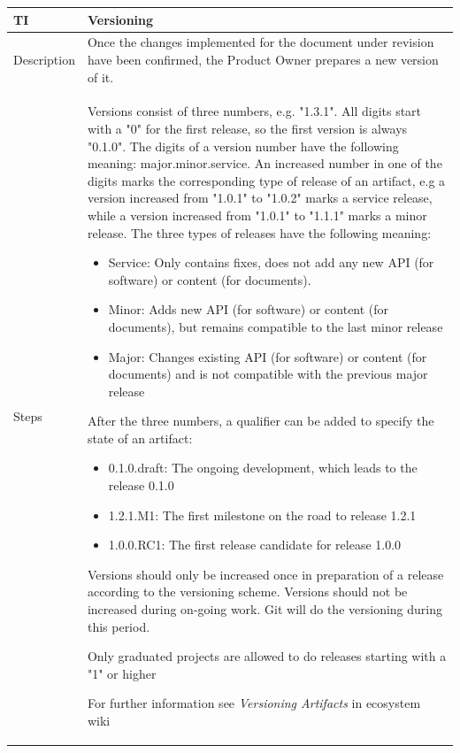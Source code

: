 \documentclass{template/openetcs_article}
\begin{document}
\begin{flushleft}
\tablefirsthead{}
\tablehead{}
\tabletail{}
\tablelasttail{}
\begin{supertabular}{|m{2cm}|m{13cm}|}
\hline
{}
TI & 
Versioning
\\\hline
Description &
Once the changes implemented for the document under revision have been confirmed, the Product Owner prepares a new version of it.
\\\hline
Steps &
Versions consist of three numbers, e.g. "1.3.1". All digits start with a "0" for the first release, so the first version is always "0.1.0". The digits of a version number have the following meaning: major.minor.service. An increased number in one of the digits marks the corresponding type of release of an artifact, e.g a version increased from "1.0.1" to "1.0.2" marks a service release, while a version increased from "1.0.1" to "1.1.1" marks a minor release. The three types of releases have the following meaning:
\begin{itemize}
\item Service: Only contains fixes, does not add any new API (for software) or content (for documents).
\item Minor: Adds new API (for software) or content (for documents), but remains compatible to the last minor release
\item Major: Changes existing API (for software) or content (for documents) and is not compatible with the previous major release
\end{itemize}
After the three numbers, a qualifier can be added to specify the state of an artifact:
\begin{itemize}
\item 0.1.0.draft: The ongoing development, which leads to the release 0.1.0
\item 1.2.1.M1: The first milestone on the road to release 1.2.1
\item 1.0.0.RC1: The first release candidate for release 1.0.0
\end{itemize}
Versions should only be increased once in preparation of a release according to the versioning scheme. Versions should not be increased during on-going work. Git will do the versioning during this period.

Only graduated projects are allowed to do releases starting with a "1" or higher

For further information see {\it Versioning Artifacts} in ecosystem wiki
\\\hline
\end{supertabular}
\end{flushleft}
\end{document}
